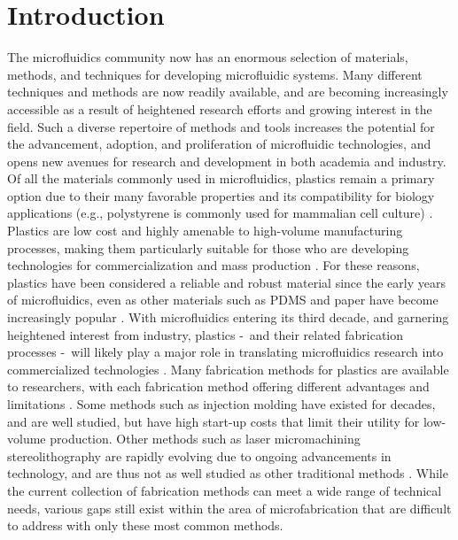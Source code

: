 \section{Introduction}
The microfluidics community now has an enormous selection of materials, methods, and techniques for developing microfluidic systems. Many different techniques and methods are now readily available, and are becoming increasingly accessible as a result of heightened research efforts and growing interest in the field. Such a diverse repertoire of methods and tools increases the potential for the advancement, adoption, and proliferation of microfluidic technologies, and opens new avenues for research and development in both academia and industry. 
Of all the materials commonly used in microfluidics, plastics remain a primary option due to their many favorable properties and its compatibility for biology applications (e.g., polystyrene is commonly used for mammalian cell culture) \cite{Young2011}. Plastics are low cost and highly amenable to high-volume manufacturing processes, making them particularly suitable for those who are developing technologies for commercialization and mass production \cite{Mukhopadhyay2007}. For these reasons, plastics have been considered a reliable and robust material since the early years of microfluidics, even as other materials such as PDMS and paper have become increasingly popular \cite{Becker2000a, Berthier2012}. With microfluidics entering its third decade, and garnering heightened interest from industry, plastics -\, and their related fabrication processes \hyphen\, will likely play a major role in translating microfluidics research into commercialized technologies \cite{Sackmann2014}.
Many fabrication methods for plastics are available to researchers, with each fabrication method offering different advantages and limitations \cite{Mukhopadhyay2007}. Some methods such as injection molding have existed for decades, and are well studied, but have high start-up costs that limit their utility for low-volume production. Other methods such as laser micromachining \cite{Sugioka2010, Wang2006, Gattass2008} stereolithography \cite{Au2014, Waldbaur2011} are rapidly evolving due to ongoing advancements in technology, and are thus not as well studied as other traditional methods \cite{Au2014}. While the current collection of fabrication methods can meet a wide range of technical needs, various gaps still exist within the area of microfabrication that are difficult to address with only these most common methods.
